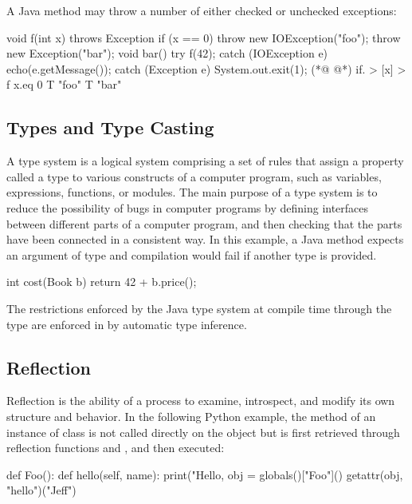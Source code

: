 A Java method may throw a number of either checked or unchecked exceptions:

\begin{ffcode}
void f(int x) throws Exception {
  if (x == 0)
    throw new IOException("foo");
  throw new Exception("bar");
}
void bar() {
  try {
    f(42);
  } catch (IOException e) {
    echo(e.getMessage());
  } catch (Exception e) {
    System.out.exit(1);
  }
}
(*@ \ffcolumnbreak @*)
if. > [x] > f
  x.eq 0
  T "foo"
  T "bar"
\end{ffcode}
\begin{ffcode}
\end{ffcode}

\subsection{Types and Type Casting}
\label{sec:types}

A type system is a logical system comprising a set of rules
  that assign a property called a type to various constructs
  of a computer program, such as variables, expressions, functions, or modules.
The main purpose of a type system is to reduce the possibility
  of bugs in computer programs by defining interfaces
  between different parts of a computer program, and then checking
  that the parts have been connected in a consistent way.
In this example, a Java method  expects an argument
  of type  and compilation would fail if another type is provided.

\begin{ffcode}
int cost(Book b) {
  return 42 + b.price();
}
\end{ffcode}

The restrictions enforced by the Java type system at compile time
  through the  type are enforced in \eolang{}
  by automatic type inference.

\subsection{Reflection}
\label{sec:reflection}

Reflection is the ability of a process to examine, introspect,
  and modify its own structure and behavior.
In the following Python example, the method  of an instance
  of class  is not called directly on the object but is first
  retrieved through reflection functions  and ,
  and then executed:

\begin{ffcode}
def Foo():
    def hello(self, name):
        print("Hello, %
obj = globals()["Foo"]()
getattr(obj, "hello")("Jeff")
\end{ffcode}

